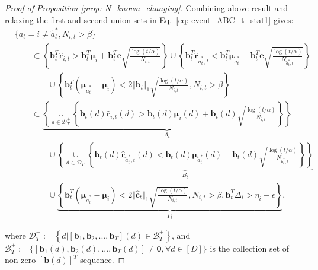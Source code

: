 \begin{proof}[Proof of Proposition \ref{prop: N_known_changing}]
Combining above result and relaxing the first and second union sets in Eq.~\ref{eq: event_ABC_t_stat1} gives:
\begin{equation}
\begin{aligned}
&{\{a_t = i \neq \tilde{a}_{t}^{*}, N_{i,t} > \beta \}} \\
& \qquad \subset
\left\{ \boldsymbol{b}_{t}^{T} \hat{\boldsymbol{r}}_{i,t} > \boldsymbol{b}_{t}^{T} \boldsymbol{\mu}_{i} + \boldsymbol{b}_{t}^{T} \boldsymbol{e} \sqrt{\frac{ \log(t/\alpha)}{N_{i,t}}} \right\} 
\cup
\left\{ \boldsymbol{b}_{t}^{T} \hat{\boldsymbol{r}}_{\tilde{a}_{t}^{*},t} < \boldsymbol{b}_{t}^{T} \boldsymbol{\mu}_{\tilde{a}_{t}^{*}} - \boldsymbol{b}_{t}^{T} \boldsymbol{e} \sqrt{\frac{ \log(t/\alpha)}{N_{\tilde{a}_{t}^{*},t}}} \right\} \\
& \qquad \qquad \cup
\left\{ \boldsymbol{b}_{t}^{T} (\boldsymbol{\mu}_{\tilde{a}_{t}^{*}}-\boldsymbol{\mu}_{i}) < 2 \Vert \boldsymbol{b}_{t} \Vert_1 \sqrt{\frac{ \log(t/\alpha)}{N_{i,t}}}, N_{i,t} > \beta \right\}  \\
& \qquad \subset
\underbrace{
\left\{ 
\underset{d \in \mathcal{D}^{+}_{T}}{\cup} \left\{ \boldsymbol{b}_{t}(d) \hat{\boldsymbol{r}}_{i,t}(d) > \boldsymbol{b}_{t}(d) \boldsymbol{\mu}_{i}(d) + \boldsymbol{b}_{t}(d) \sqrt{\frac{ \log(t/\alpha)}{N_{i,t}}} \right\} \right\}}_{A_t} \\
& \qquad \qquad \cup
\underbrace{
\left \{
\underset{d \in \mathcal{D}^{+}_{T}}{\cup} \left\{ \boldsymbol{b}_{t}(d) \hat{\boldsymbol{r}}_{\tilde{a}_{t}^{*},t}(d) < \boldsymbol{b}_{t}(d) \boldsymbol{\mu}_{\tilde{a}_{t}^{*}}(d) - \boldsymbol{b}_{t}(d) \sqrt{\frac{ \log(t/\alpha)}{N_{\tilde{a}_{t}^{*},t}}}\right\}\right\}}_{B_t} \\
& \qquad \qquad \cup
\underbrace{
\left\{ \boldsymbol{b}_{t}^{T} (\boldsymbol{\mu}_{\tilde{a}_{t}^{*}}-\boldsymbol{\mu}_{i}) < 2 \Vert \hat{\boldsymbol{c}}_t \Vert_1 \sqrt{\frac{ \log(t/\alpha)}{N_{i,t}}}, N_{i,t} > \beta, \boldsymbol{b}_{t}^{T} \Delta_{i} > \eta_{i} - \epsilon\right\}}_{\Gamma_t},
\end{aligned}
\end{equation}

where $\mathcal{D}^{+}_{T} :=\left\{ d| [\boldsymbol{b}_{1}, \boldsymbol{b}_{2}, ..., \boldsymbol{b}_{T}](d) \in \mathcal{B}^{+}_{T} \right\}$, and $\mathcal{B}^{+}_{T}:= \{{[\boldsymbol{b}_{1}(d), \boldsymbol{b}_{2}(d), ..., \boldsymbol{b}_{T}(d)]} \neq \boldsymbol{0}, \forall d \in [D]\}$ is the collection set of non-zero $[\boldsymbol{b}(d)]^T$ sequence.


\end{proof}

